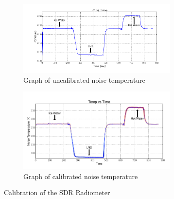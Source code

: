 %
\begin{figure}	
	\centering
	\begin{subfigure}[t]{8cm}
		\centering
		\includegraphics[width=8cm]{images/89}
		\caption{Graph of uncalibrated noise temperature \citep{nelson-15}}
		\label{fig:uncalibrated_radiometer} 
	\end{subfigure}
	\quad
	\begin{subfigure}[t]{8cm}
		\centering
		\includegraphics[width=8cm]{images/87}
		\caption{Graph of calibrated noise temperature \citep{nelson-15}}
		\label{fig:calibrated_radiometer}
	\end{subfigure}
	\caption{Calibration of the SDR Radiometer}
	\label{fig:sdr_radiometer_calibration}
\end{figure}
%


